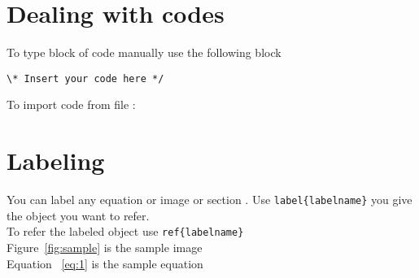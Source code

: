 \documentclass[11pt, a4paper]{article}
\begin{document}
\section{Dealing with codes}
To type block of code manually use the following block
\begin{verbatim}	
\* Insert your code here */ 
\end{verbatim}
To import code from file : 

\section{Labeling}
You can label any equation or image or section . Use \texttt{label\{labelname\}}  you give the object you want to refer.\\
To refer the labeled object use \texttt{ref\{labelname\}} \\
Figure~\ref{fig:sample} is the sample image \\
Equation ~\ref{eq:1} is the sample equation 
\end{document}
